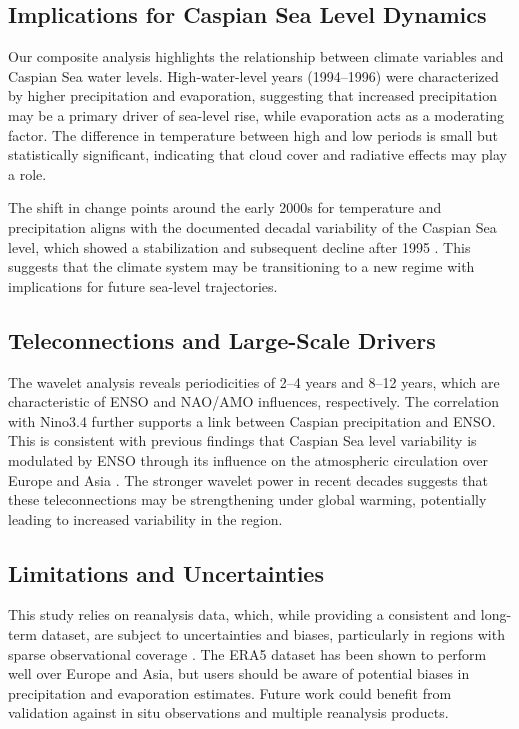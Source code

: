 \documentclass[12pt,a4paper]{article}
\begin{document}
\subsection{Implications for Caspian Sea Level Dynamics}

Our composite analysis highlights the relationship between climate variables and Caspian Sea water levels. High-water-level years (1994–1996) were characterized by higher precipitation and evaporation, suggesting that increased precipitation may be a primary driver of sea-level rise, while evaporation acts as a moderating factor. The difference in temperature between high and low periods is small but statistically significant, indicating that cloud cover and radiative effects may play a role.

The shift in change points around the early 2000s for temperature and precipitation aligns with the documented decadal variability of the Caspian Sea level, which showed a stabilization and subsequent decline after 1995 \citep{arpad2006}. This suggests that the climate system may be transitioning to a new regime with implications for future sea-level trajectories.

\subsection{Teleconnections and Large-Scale Drivers}

The wavelet analysis reveals periodicities of 2–4 years and 8–12 years, which are characteristic of ENSO and NAO/AMO influences, respectively. The correlation with Nino3.4 further supports a link between Caspian precipitation and ENSO. This is consistent with previous findings that Caspian Sea level variability is modulated by ENSO through its influence on the atmospheric circulation over Europe and Asia \citep{arpad2006,kislov2018}. The stronger wavelet power in recent decades suggests that these teleconnections may be strengthening under global warming, potentially leading to increased variability in the region.

\subsection{Limitations and Uncertainties}

This study relies on reanalysis data, which, while providing a consistent and long-term dataset, are subject to uncertainties and biases, particularly in regions with sparse observational coverage \citep{hersbach2020}. The ERA5 dataset has been shown to perform well over Europe and Asia, but users should be aware of potential biases in precipitation and evaporation estimates. Future work could benefit from validation against in situ observations and multiple reanalysis products.
\end{document}
